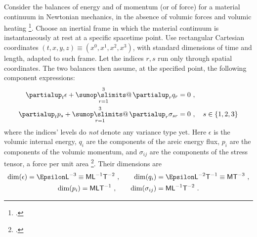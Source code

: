 \documentclass[\ifafour a4paper,12pt,\else a5paper,10pt,\fi%
onecolumn,oneside,article,%
british%
]{memoir}
\makeatletter
\theoremstyle{remark}
\theoremstyle{innote}
\def\sum{\DOTSI\sumop\slimits@}
\newcommand*{\citep}{\footcites}
\newcommand*{\de}{\partialup}%
\DeclarePairedDelimiter\set{\{}{\}}
\renewcommand*{\|}[1][]{\nonscript\,#1\vert\nonscript\;\mathopen{}}
\newcommand*{\sect}{\S}%
\newcommand*{\cf}{{cf.}}
\newcommand*{\tsum}{\mathop{\textstyle\sum}\nolimits}
\newcommand*{\Le}{\textsf{L}}
\newcommand*{\Ti}{\textsf{T}}
\newcommand*{\Ma}{\textsf{M}}
\newcommand*{\En}{\Epsilon}%
\newcommand*{\en}{\epsilon}
\newcommand*{\yq}{q}
\newcommand*{\yp}{p}
\newcommand*{\yt}{\sigma}
\makeatother
\begin{document}
Consider the balances of energy and of momentum (or of force) for a
material continuum in Newtonian mechanics, in the absence of volumic forces
and volumic heating
\citep{truesdelletal1960,truesdell1977_r1991}{birdetal1960_r2002}{samohyletal1987_r2014}.
Choose an inertial frame in which the material continuum is instantaneously
at rest at a specific spacetime point. Use rectangular Cartesian
coordinates $(t,x,y,z) \equiv (x^{0},x^{1},x^{2},x^{3})$, with standard
dimensions of time and length, adapted to such frame. Let the indices $r,s$
run only through spatial coordinates. The two balances then assume, at the
specified point, the following component expressions:
\begin{align}
  \label{eq:bal_energy}
  \de_{t} \en + \tsum\limits_{r=1}^{3}\de_{r} \yq_{r} &= 0 \ ,
  \\
  \label{eq:bal_force}
  \de_{t} \yp_{s} + \tsum\limits_{r=1}^{3}\de_{r}\yt_{sr} &= 0 \ ,
  \quad s \in \set{1,2,3}
\end{align}
where the indices' levels do \emph{not} denote any variance type yet. Here
$\en$ is the volumic internal energy, $\yq_{i}$ are the components of the
areic energy flux, $\yp_{i}$ are the components of the volumic momentum,
and $\yt_{ij}$ are the components of the stress tensor, a force per unit
area \citep[considered as pressure rather than tension, hence
its sign; \cf][\sect~1.2 p.~19]{birdetal1960_r2002}. Their dimensions are
\begin{subequations}\label{eq:dims_stress_components}
  \begin{gather}
    \label{eq:dim_en}
    \dim(\en) = \En\Le^{-3} \equiv \Ma\Le^{-1}\Ti^{-2} \ ,
    \qquad
    \dim(\yq_{i}) = \En\Le^{-2}\Ti^{-1} \equiv \Ma\Ti^{-3} \ ,
    \\
    \label{eq:dim_yp}
    \dim(\yp_{i}) = \Ma\Le\Ti^{-1} \ ,
    \qquad
    \dim(\yt_{ij}) = \Ma\Le^{-1}\Ti^{-2} \ .
  \end{gather}
\end{subequations}
\end{document}
